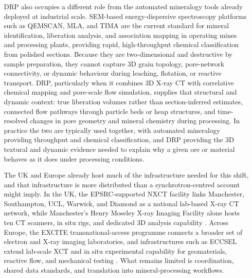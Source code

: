 \documentclass[12pt,a4paper]{article}
\begin{document}
DRP also occupies a different role from the automated mineralogy tools already deployed at industrial scale. SEM-based energy-dispersive spectroscopy platforms such as QEMSCAN, MLA, and TIMA are the current standard for mineral identification, liberation analysis, and association mapping in operating mines and processing plants, providing rapid, high-throughput chemical classification from polished sections. Because they are two-dimensional and destructive by sample preparation, they cannot capture 3D grain topology, pore-network connectivity, or dynamic behaviour during leaching, flotation, or reactive transport. DRP, particularly when it combines 3D X-ray CT with correlative chemical mapping and pore-scale flow simulation, supplies that structural and dynamic context: true liberation volumes rather than section-inferred estimates, connected flow pathways through particle beds or heap structures, and time-resolved changes in pore geometry and mineral chemistry during processing. In practice the two are typically used together, with automated mineralogy providing throughput and chemical classification, and DRP providing the 3D textural and dynamic evidence needed to explain why a given ore or material behaves as it does under processing conditions.

The UK and Europe already host much of the infrastructure needed for this shift, and that infrastructure is more distributed than a synchrotron-centred account might imply. In the UK, the EPSRC-supported NXCT facility links Manchester, Southampton, UCL, Warwick, and Diamond as a national lab-based X-ray CT network, while Manchester's Henry Moseley X-ray Imaging Facility alone hosts ten CT scanners, in situ rigs, and dedicated 3D analysis capability \cite{manchester_nxct_2026}. Across Europe, the EXCITE transnational-access programme connects a broader set of electron and X-ray imaging laboratories, and infrastructures such as ECCSEL extend lab-scale XCT and in situ experimental capability for geomaterials, reactive flow, and mechanical testing \cite{excite_access_2026, eccsel_strath_xct_2026}. What remains limited is coordination, shared data standards, and translation into mineral-processing workflows.
\end{document}
